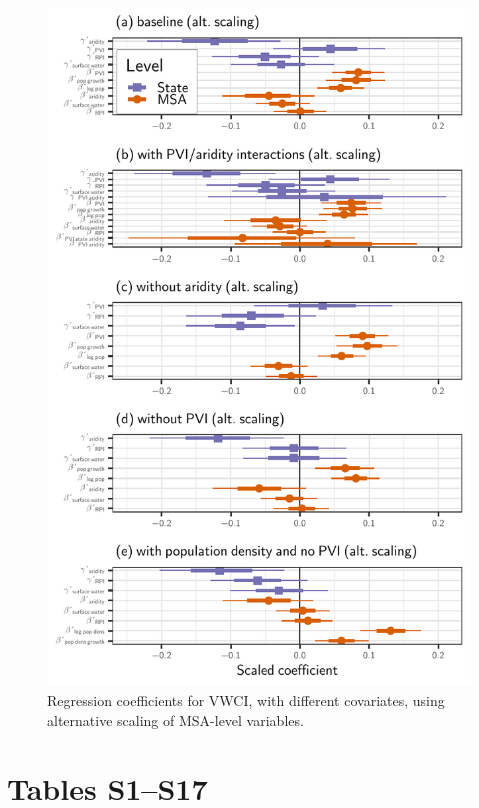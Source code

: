\documentclass[draft]{agujournal}\usepackage{knitr}
\begin{document}
\begin{figure}
\includegraphics[width=6.25in]{figures_si/pooled_vwci_pvi_cat_plots-1} \caption[Regression coefficients for VWCI, with different covariates, using alternative scaling of MSA-level variables]{Regression coefficients for VWCI, with different covariates, using alternative scaling of MSA-level variables.}\label{fig:pooled_vwci_pvi_cat_plots}
\end{figure}



\clearpage
\section{Tables S1--S17}
\end{document}

